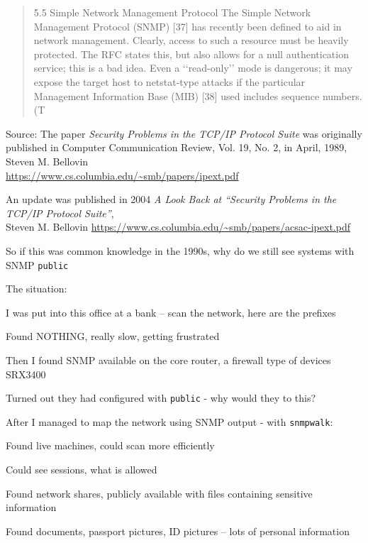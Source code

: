 \documentclass[Screen16to9,17pt]{foils}
\begin{document}

\begin{quote}
5.5 Simple Network Management Protocol
The Simple Network Management Protocol (SNMP) [37] has recently been defined to aid in network
management. Clearly, access to such a resource must be heavily protected. The RFC states this, but
also allows for a null authentication service; this is a bad idea. Even a ‘‘read-only’’ mode is dangerous;
it may expose the target host to netstat-type attacks if the particular Management Information Base
(MIB) [38] used includes sequence numbers. (T
\end{quote}
Source: The paper \emph{Security Problems in the TCP/IP Protocol Suite} was originally\\
published in Computer Communication Review, Vol. 19, No. 2, in April, 1989, Steven M. Bellovin\\
\url{https://www.cs.columbia.edu/~smb/papers/ipext.pdf}

An update was published in 2004
\emph{A Look Back at “Security Problems in the TCP/IP Protocol Suite”}, \\
Steven M. Bellovin
\url{https://www.cs.columbia.edu/~smb/papers/acsac-ipext.pdf}

So if this was common knowledge in the 1990s, why do we still see systems with SNMP \verb+public+

The situation:
\begin{list2}
\item I was put into this office at a bank -- scan the network, here are the prefixes
\item Found NOTHING, really slow, getting frustrated
\item Then I found SNMP available on the core router, a firewall type of devices SRX3400
\item Turned out they had configured with \verb+public+ - why would they to this?
\end{list2}


After I managed to map the network using SNMP output - with \verb+snmpwalk+:
\begin{list2}
\item Found live machines, could scan more efficiently
\item Could see sessions, what is allowed
\item Found network shares, publicly available with files containing sensitive information
\item Found documents, passport pictures, ID pictures -- lots of personal information
\end{list2}
\end{document}

